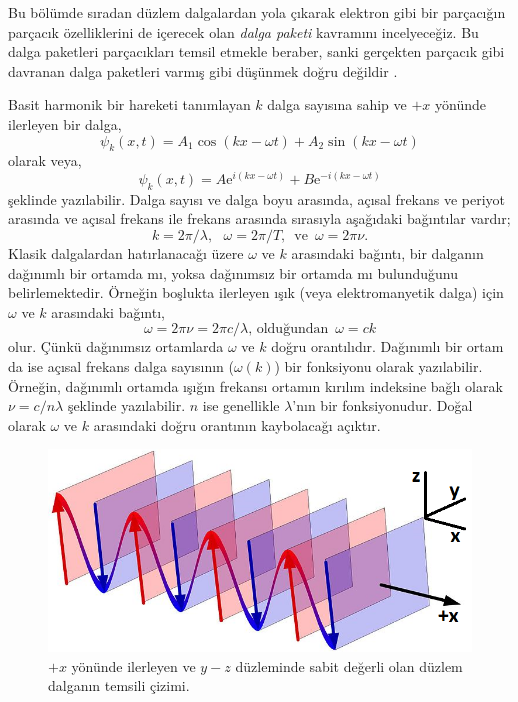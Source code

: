 \documentclass[a4paper,12pt, twoside]{article}
\begin{document}
Bu bölümde sıradan düzlem dalgalardan yola çıkarak elektron gibi bir parçacığın parçacık özelliklerini de içerecek olan \emph{dalga paketi} kavramını incelyeceğiz. Bu dalga paketleri parçacıkları temsil etmekle beraber, sanki gerçekten parçacık gibi davranan dalga paketleri varmış gibi düşünmek doğru değildir \cite{book:Gasiorowicz}.

Basit harmonik bir hareketi tanımlayan $k$ dalga sayısına sahip ve $+x$ yönünde ilerleyen bir dalga,
\begin{equation}
\psi_k(x, t) = A_1 \cos(kx - \omega t) + A_2 \sin(kx - \omega t)
\label{eq:plane_sin_wave}
\end{equation}
olarak veya,
\begin{equation}
\psi_k(x, t) = A \text{e}^{i(kx - \omega t)} + B \text{e}^{-i(kx - \omega t)}
\label{eq:plane_exp_wave}
\end{equation}
şeklinde yazılabilir. Dalga sayısı ve dalga boyu arasında, açısal frekans ve periyot arasında ve açısal frekans ile frekans arasında sırasıyla aşağıdaki bağıntılar vardır;
\begin{equation}
k = 2\pi/\lambda, \,\,\,\, \omega = 2\pi/T,\,\,\, \text{ve}\,\,\, \omega = 2\pi\nu.
\label{eq:wave_length_number}
\end{equation}
Klasik dalgalardan hatırlanacağı üzere $\omega$ ve $k$ arasındaki bağıntı, bir dalganın dağınımlı bir ortamda mı, yoksa dağınımsız bir ortamda mı bulunduğunu belirlemektedir. Örneğin boşlukta ilerleyen ışık (veya elektromanyetik dalga) için $\omega$ ve $k$ arasındaki bağıntı,
\begin{equation}
\omega = 2\pi \nu = 2 \pi c/\lambda \text{, olduğundan }\, \omega = c k
\label{eq:w_k_relation}
\end{equation}
olur. Çünkü dağınımsız ortamlarda $\omega$ ve $k$ doğru orantılıdır. Dağınımlı bir ortam da ise açısal frekans dalga sayısının ($\omega(k)$) bir fonksiyonu olarak yazılabilir. Örneğin, dağınımlı ortamda ışığın frekansı ortamın kırılım indeksine bağlı olarak $\nu = c/n\lambda$ şeklinde yazılabilir. $n$ ise genellikle $\lambda$'nın bir fonksiyonudur. Doğal olarak $\omega$ ve $k$ arasındaki doğru orantının kaybolacağı açıktır.
\begin{figure}[hbtp]
\center
\includegraphics[scale=1.5]{Plane_Wave_Oblique_View.png}
\caption{$+x$ yönünde ilerleyen ve $y-z$ düzleminde sabit değerli olan düzlem dalganın temsili çizimi.}
\label{fig:plane_wave}
\end{figure}
\end{document}
